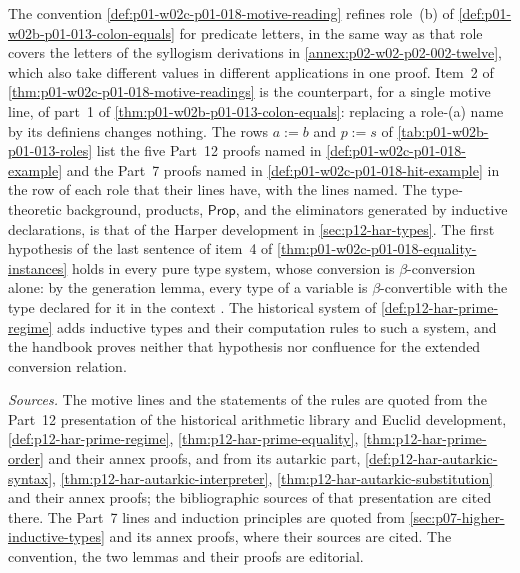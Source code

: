 The convention \cref{def:p01-w02c-p01-018-motive-reading} refines
role~(b) of \cref{def:p01-w02b-p01-013-colon-equals} for predicate
letters, in the same way as that role covers the letters of the syllogism
derivations in \cref{annex:p02-w02-p02-002-twelve}, which also take
different values in different applications in one proof.  Item~2 of
\cref{thm:p01-w02c-p01-018-motive-readings} is the counterpart, for a
single motive line, of part~1 of \cref{thm:p01-w02b-p01-013-colon-equals}:
replacing a role-(a) name by its definiens changes nothing.  The rows
\(a:=b\) and \(p:=s\) of \cref{tab:p01-w02b-p01-013-roles} list the five
Part~12 proofs named in \cref{def:p01-w02c-p01-018-example} and the Part~7
proofs named in \cref{def:p01-w02c-p01-018-hit-example} in the row of each
role that their lines have, with the lines named.  The type-theoretic
background, products, \(\mathsf{Prop}\), and the eliminators generated by
inductive declarations, is that of the Harper development in
\cref{sec:p12-har-types}.  The first hypothesis of the last sentence of
item~4 of \cref{thm:p01-w02c-p01-018-equality-instances} holds in every
pure type system, whose conversion is \(\beta\)-conversion alone: by the
generation lemma, every type of a variable is \(\beta\)-convertible with
the type declared for it in the context
\cite[Lemma~5.2.13, item~2, p.~221]{Barendregt1992}.  The historical
system of \cref{def:p12-har-prime-regime} adds inductive types and their
computation rules to such a system, and the handbook proves neither that
hypothesis nor confluence for the extended conversion relation.

\emph{Sources.}  The motive lines and the statements of the rules are
quoted from the Part~12 presentation of the historical arithmetic library
and Euclid development, \cref{def:p12-har-prime-regime},
\cref{thm:p12-har-prime-equality}, \cref{thm:p12-har-prime-order} and
their annex proofs, and from its autarkic part,
\cref{def:p12-har-autarkic-syntax}, \cref{thm:p12-har-autarkic-interpreter},
\cref{thm:p12-har-autarkic-substitution} and their annex proofs; the
bibliographic sources of that presentation are cited there.  The Part~7
lines and induction principles are quoted from
\cref{sec:p07-higher-inductive-types} and its annex proofs, where their
sources are cited.  The convention, the two lemmas and
their proofs are editorial.
